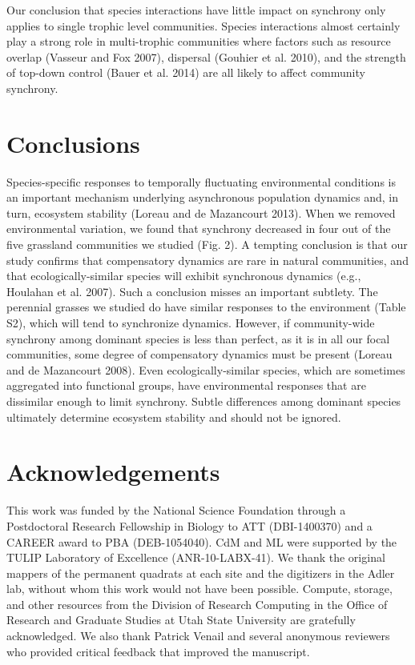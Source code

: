 \documentclass[12pt,]{article}
\begin{document}
Our conclusion that species interactions have little impact on synchrony
only applies to single trophic level communities. Species interactions
almost certainly play a strong role in multi-trophic communities where
factors such as resource overlap (Vasseur and Fox 2007), dispersal
(Gouhier et al. 2010), and the strength of top-down control (Bauer et
al. 2014) are all likely to affect community synchrony.

\section{Conclusions}

Species-specific responses to temporally fluctuating environmental
conditions is an important mechanism underlying asynchronous population
dynamics and, in turn, ecosystem stability (Loreau and {{de Mazancourt}}
2013). When we removed environmental variation, we found that synchrony
decreased in four out of the five grassland communities we studied (Fig.
2). A tempting conclusion is that our study confirms that compensatory
dynamics are rare in natural communities, and that ecologically-similar
species will exhibit synchronous dynamics (e.g., Houlahan et al. 2007).
Such a conclusion misses an important subtlety. The perennial grasses we
studied do have similar responses to the environment (Table S2), which
will tend to synchronize dynamics. However, if community-wide synchrony
among dominant species is less than perfect, as it is
in all our focal communities, some degree of compensatory dynamics must
be present (Loreau and {{de Mazancourt}} 2008).
Even ecologically-similar species, which are sometimes aggregated into functional groups, have environmental responses that are dissimilar enough to limit synchrony.
Subtle differences among dominant species ultimately determine ecosystem stability and should not be ignored.

\section{Acknowledgements}

This work was funded by the National Science Foundation through a
Postdoctoral Research Fellowship in Biology to ATT (DBI-1400370) and a
CAREER award to PBA (DEB-1054040). CdM and ML were supported by the
TULIP Laboratory of Excellence (ANR-10-LABX-41). We thank the original
mappers of the permanent quadrats at each site and the digitizers in the
Adler lab, without whom this work would not have been possible. Compute,
storage, and other resources from the Division of Research Computing in
the Office of Research and Graduate Studies at Utah State University are
gratefully acknowledged. We also thank Patrick Venail and several
anonymous reviewers who provided critical feedback that improved the
manuscript.
\end{document}
